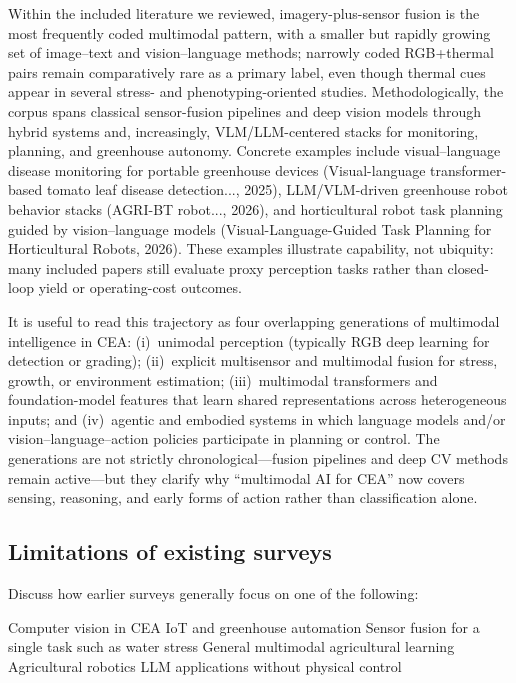 \documentclass[lettersize,journal]{IEEEtran}
\begin{document}
Within the included literature we reviewed, imagery-plus-sensor fusion is the most frequently coded multimodal pattern, with a smaller but rapidly growing set of image--text and vision--language methods; narrowly coded RGB+thermal pairs remain comparatively rare as a primary label, even though thermal cues appear in several stress- and phenotyping-oriented studies. Methodologically, the corpus spans classical sensor-fusion pipelines and deep vision models through hybrid systems and, increasingly, VLM/LLM-centered stacks for monitoring, planning, and greenhouse autonomy. Concrete examples include visual--language disease monitoring for portable greenhouse devices (Visual-language transformer-based tomato leaf disease detection..., 2025), LLM/VLM-driven greenhouse robot behavior stacks (AGRI-BT robot..., 2026), and horticultural robot task planning guided by vision--language models (Visual-Language-Guided Task Planning for Horticultural Robots, 2026). These examples illustrate capability, not ubiquity: many included papers still evaluate proxy perception tasks rather than closed-loop yield or operating-cost outcomes.

It is useful to read this trajectory as four overlapping generations of multimodal intelligence in CEA: (i)~unimodal perception (typically RGB deep learning for detection or grading); (ii)~explicit multisensor and multimodal fusion for stress, growth, or environment estimation; (iii)~multimodal transformers and foundation-model features that learn shared representations across heterogeneous inputs; and (iv)~agentic and embodied systems in which language models and/or vision--language--action policies participate in planning or control. The generations are not strictly chronological---fusion pipelines and deep CV methods remain active---but they clarify why ``multimodal AI for CEA'' now covers sensing, reasoning, and early forms of action rather than classification alone.



\subsection{Limitations of existing surveys}

Discuss how earlier surveys generally focus on one of the following:

Computer vision in CEA
IoT and greenhouse automation
Sensor fusion for a single task such as water stress
General multimodal agricultural learning
Agricultural robotics
LLM applications without physical control
\end{document}
